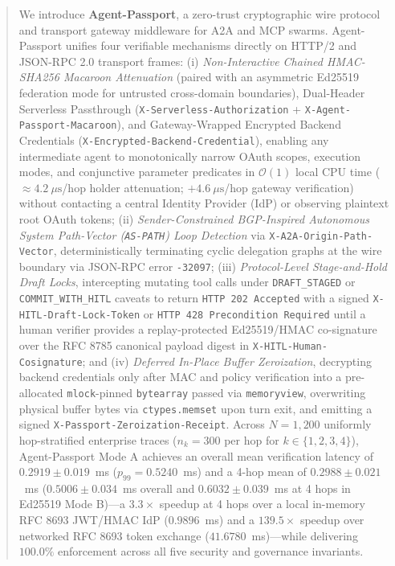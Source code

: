 \documentclass[conference,10pt]{IEEEtran}
\begin{document}
\begin{abstract}
We introduce \textbf{Agent-Passport}, a zero-trust cryptographic wire protocol and transport gateway middleware for A2A and MCP swarms. Agent-Passport unifies four verifiable mechanisms directly on HTTP/2 and JSON-RPC 2.0 transport frames: (i) \emph{Non-Interactive Chained HMAC-SHA256 Macaroon Attenuation} (paired with an asymmetric Ed25519 federation mode for untrusted cross-domain boundaries), Dual-Header Serverless Passthrough (\texttt{X-Serverless-Authorization} + \texttt{X-Agent-Passport-Macaroon}), and Gateway-Wrapped Encrypted Backend Credentials (\texttt{X-Encrypted-Backend-Credential}), enabling any intermediate agent to monotonically narrow OAuth scopes, execution modes, and conjunctive parameter predicates in $\mathcal{O}(1)$ local CPU time ($\approx 4.2~\mu\text{s}$/hop holder attenuation; $+4.6~\mu\text{s}$/hop gateway verification) without contacting a central Identity Provider (IdP) or observing plaintext root OAuth tokens; (ii) \emph{Sender-Constrained BGP-Inspired Autonomous System Path-Vector (\texttt{AS-PATH}) Loop Detection} via \texttt{X-A2A-Origin-Path-Vector}, deterministically terminating cyclic delegation graphs at the wire boundary via JSON-RPC error \texttt{-32097}; (iii) \emph{Protocol-Level Stage-and-Hold Draft Locks}, intercepting mutating tool calls under \texttt{DRAFT\_STAGED} or \texttt{COMMIT\_WITH\_HITL} caveats to return \texttt{HTTP 202 Accepted} with a signed \texttt{X-HITL-Draft-Lock-Token} or \texttt{HTTP 428 Precondition Required} until a human verifier provides a replay-protected Ed25519/HMAC co-signature over the RFC 8785 canonical payload digest in \texttt{X-HITL-Human-Cosignature}; and (iv) \emph{Deferred In-Place Buffer Zeroization}, decrypting backend credentials only after MAC and policy verification into a pre-allocated \texttt{mlock}-pinned \texttt{bytearray} passed via \texttt{memoryview}, overwriting physical buffer bytes via \texttt{ctypes.memset} upon turn exit, and emitting a signed \texttt{X-Passport-Zeroization-Receipt}. Across $N = 1{,}200$ uniformly hop-stratified enterprise traces ($n_k = 300$ per hop for $k \in \{1, 2, 3, 4\}$), Agent-Passport Mode A achieves an overall mean verification latency of $0.2919 \pm 0.019$~ms ($p_{99} = 0.5240$~ms) and a 4-hop mean of $0.2988 \pm 0.021$~ms ($0.5006 \pm 0.034$~ms overall and $0.6032 \pm 0.039$~ms at 4 hops in Ed25519 Mode B)---a $3.3\times$ speedup at 4 hops over a local in-memory RFC 8693 JWT/HMAC IdP ($0.9896$~ms) and a $139.5\times$ speedup over networked RFC 8693 token exchange ($41.6780$~ms)---while delivering $100.0\%$ enforcement across all five security and governance invariants.
\end{abstract}
\end{document}
